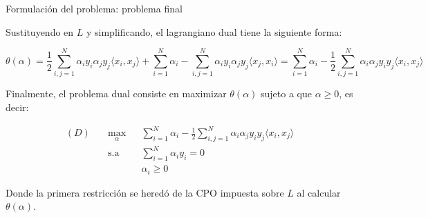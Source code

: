 \documentclass[handout, 9pt]{beamer}
\begin{document}
\begin{frame}{Formulación del problema: problema final}

Sustituyendo en $L$ y simplificando, el lagrangiano dual tiene la siguiente forma:

\begin{equation*}
	\theta(\alpha) = \frac{1}{2} \sum_{i,j=1}^N \alpha_i y_i \alpha_j y_j \langle x_i,x_j\rangle + \sum_{i=1}^N \alpha_i - \sum_{i,j=1}^N \alpha_i y_i \alpha_j y_j \langle x_j,x_i\rangle = \sum_{i=1}^N \alpha_i - \frac{1}{2} \sum_{i,j=1}^N \alpha_i \alpha_j y_i y_j \langle x_i,x_j\rangle
\end{equation*}\pause

Finalmente, el problema dual consiste en maximizar $\theta(\alpha)$ sujeto a que $\alpha\geq 0$, es decir:


\begin{equation*}
\begin{aligned}
(D)\quad & \underset{\alpha}{\max}
& & \sum\limits_{i=1}^{N}\alpha_i - \frac{1}{2} \sum\limits_{i,j=1}^{N} \alpha_i \alpha_j y_i y_j \langle x_i, x_j\rangle\\
& \text{s.a}
& & \sum\limits_{i=1}^{N} \alpha_i y_i= 0 \\
& &  &\alpha_i \geq 0
\end{aligned}
\end{equation*}

Donde la primera restricción se heredó de la CPO impuesta sobre $L$ al calcular $\theta(\alpha)$.
	
\end{frame}
\end{document}

